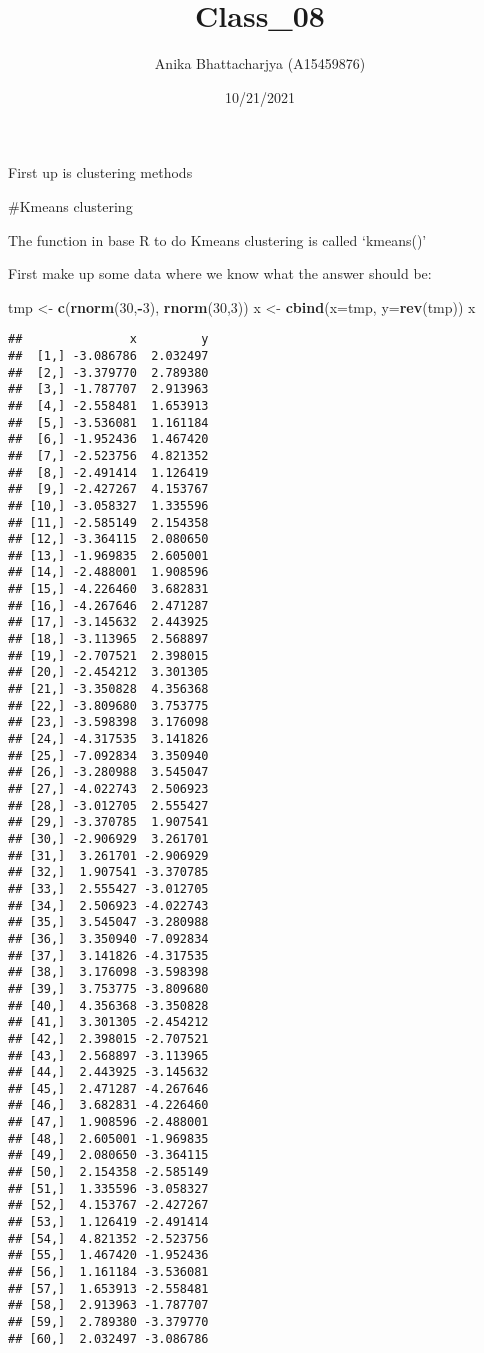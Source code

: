 \documentclass[]{article}
\title{Class\_08}
\author{Anika Bhattacharjya (A15459876)}
\date{10/21/2021}
\newenvironment{Shaded}{\begin{snugshade}}{\end{snugshade}}
\newcommand{\DataTypeTok}[1]{\textcolor[rgb]{0.13,0.29,0.53}{#1}}
\newcommand{\DecValTok}[1]{\textcolor[rgb]{0.00,0.00,0.81}{#1}}
\newcommand{\KeywordTok}[1]{\textcolor[rgb]{0.13,0.29,0.53}{\textbf{#1}}}
\newcommand{\NormalTok}[1]{#1}
\newcommand{\OperatorTok}[1]{\textcolor[rgb]{0.81,0.36,0.00}{\textbf{#1}}}
\newcommand{\StringTok}[1]{\textcolor[rgb]{0.31,0.60,0.02}{#1}}
\begin{document}
\maketitle

First up is clustering methods

\#Kmeans clustering

The function in base R to do Kmeans clustering is called `kmeans()'

First make up some data where we know what the answer should be:

\begin{Shaded}
\begin{Highlighting}[]
\NormalTok{tmp <-}\StringTok{ }\KeywordTok{c}\NormalTok{(}\KeywordTok{rnorm}\NormalTok{(}\DecValTok{30}\NormalTok{,}\OperatorTok{-}\DecValTok{3}\NormalTok{), }\KeywordTok{rnorm}\NormalTok{(}\DecValTok{30}\NormalTok{,}\DecValTok{3}\NormalTok{))}
\NormalTok{x <-}\StringTok{ }\KeywordTok{cbind}\NormalTok{(}\DataTypeTok{x=}\NormalTok{tmp, }\DataTypeTok{y=}\KeywordTok{rev}\NormalTok{(tmp))}
\NormalTok{x}
\end{Highlighting}
\end{Shaded}

\begin{verbatim}
##               x         y
##  [1,] -3.086786  2.032497
##  [2,] -3.379770  2.789380
##  [3,] -1.787707  2.913963
##  [4,] -2.558481  1.653913
##  [5,] -3.536081  1.161184
##  [6,] -1.952436  1.467420
##  [7,] -2.523756  4.821352
##  [8,] -2.491414  1.126419
##  [9,] -2.427267  4.153767
## [10,] -3.058327  1.335596
## [11,] -2.585149  2.154358
## [12,] -3.364115  2.080650
## [13,] -1.969835  2.605001
## [14,] -2.488001  1.908596
## [15,] -4.226460  3.682831
## [16,] -4.267646  2.471287
## [17,] -3.145632  2.443925
## [18,] -3.113965  2.568897
## [19,] -2.707521  2.398015
## [20,] -2.454212  3.301305
## [21,] -3.350828  4.356368
## [22,] -3.809680  3.753775
## [23,] -3.598398  3.176098
## [24,] -4.317535  3.141826
## [25,] -7.092834  3.350940
## [26,] -3.280988  3.545047
## [27,] -4.022743  2.506923
## [28,] -3.012705  2.555427
## [29,] -3.370785  1.907541
## [30,] -2.906929  3.261701
## [31,]  3.261701 -2.906929
## [32,]  1.907541 -3.370785
## [33,]  2.555427 -3.012705
## [34,]  2.506923 -4.022743
## [35,]  3.545047 -3.280988
## [36,]  3.350940 -7.092834
## [37,]  3.141826 -4.317535
## [38,]  3.176098 -3.598398
## [39,]  3.753775 -3.809680
## [40,]  4.356368 -3.350828
## [41,]  3.301305 -2.454212
## [42,]  2.398015 -2.707521
## [43,]  2.568897 -3.113965
## [44,]  2.443925 -3.145632
## [45,]  2.471287 -4.267646
## [46,]  3.682831 -4.226460
## [47,]  1.908596 -2.488001
## [48,]  2.605001 -1.969835
## [49,]  2.080650 -3.364115
## [50,]  2.154358 -2.585149
## [51,]  1.335596 -3.058327
## [52,]  4.153767 -2.427267
## [53,]  1.126419 -2.491414
## [54,]  4.821352 -2.523756
## [55,]  1.467420 -1.952436
## [56,]  1.161184 -3.536081
## [57,]  1.653913 -2.558481
## [58,]  2.913963 -1.787707
## [59,]  2.789380 -3.379770
## [60,]  2.032497 -3.086786
\end{verbatim}
\end{document}
